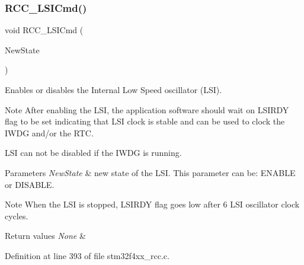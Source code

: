 \mbox{\label{group___r_c_c___group1_ga81e3ca29fd154ac2019bba6936d6d5ed}} 
\subsubsection{\texorpdfstring{R\+C\+C\+\_\+\+L\+S\+I\+Cmd()}{RCC\_LSICmd()}}
{\footnotesize\ttfamily void R\+C\+C\+\_\+\+L\+S\+I\+Cmd (\begin{DoxyParamCaption}\item[{Functional\+State}]{New\+State }\end{DoxyParamCaption})}



Enables or disables the Internal Low Speed oscillator (L\+SI). 

\begin{DoxyNote}{Note}
After enabling the L\+SI, the application software should wait on L\+S\+I\+R\+DY flag to be set indicating that L\+SI clock is stable and can be used to clock the I\+W\+DG and/or the R\+TC. 

L\+SI can not be disabled if the I\+W\+DG is running. 
\end{DoxyNote}

\begin{DoxyParams}{Parameters}
{\em New\+State} & new state of the L\+SI. This parameter can be\+: E\+N\+A\+B\+LE or D\+I\+S\+A\+B\+LE. \\
\hline
\end{DoxyParams}
\begin{DoxyNote}{Note}
When the L\+SI is stopped, L\+S\+I\+R\+DY flag goes low after 6 L\+SI oscillator clock cycles. 
\end{DoxyNote}

\begin{DoxyRetVals}{Return values}
{\em None} & \\
\hline
\end{DoxyRetVals}


Definition at line 393 of file stm32f4xx\+\_\+rcc.\+c.

